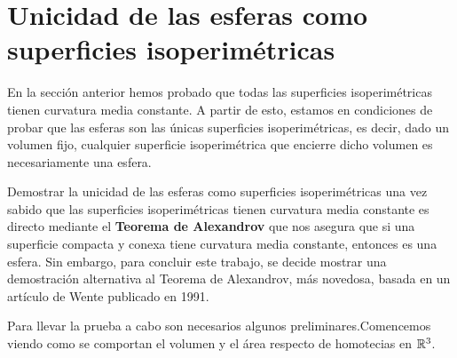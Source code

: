 \section{Unicidad de las esferas como superficies isoperimétricas}

En la sección anterior hemos probado que todas las superficies isoperimétricas tienen curvatura media constante. A partir de esto, estamos en condiciones de probar que las esferas son las únicas superficies isoperimétricas, es decir, dado un volumen fijo, cualquier superficie isoperimétrica que encierre dicho volumen es necesariamente una esfera.

Demostrar la unicidad de las esferas como superficies isoperimétricas una vez sabido que las superficies isoperimétricas tienen curvatura media constante es directo mediante el \textbf{Teorema de Alexandrov} que nos asegura que si una superficie compacta y conexa tiene curvatura media constante, entonces es una esfera. Sin embargo, para concluir este trabajo, se decide mostrar una demostración alternativa al Teorema de Alexandrov, más novedosa, basada en un artículo de Wente \cite{wenteproof} publicado en 1991.

Para llevar la prueba a cabo son necesarios algunos preliminares.Comencemos viendo como se comportan el volumen y el área respecto de homotecias en $\mathbb{R}^3$.

